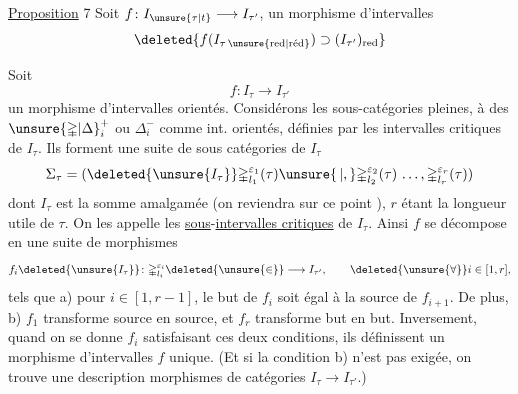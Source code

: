 \uline{Proposition} 7 Soit $f\colon I_{\unsure{\tau|t}}\longrightarrow I_{\tau'}$, un morphisme
d'intervalles   
\[
\deleted{f(I_{\tau\,\unsure{\mathrm{red}|\mathrm{r\acute ed}}})\supset(I_{\tau'})_{\mathrm{red}}}
\]

Soit
\[
 f\colon I_\tau\longrightarrow I_{\tau'}
\]
un morphisme d'intervalles orientés. 
Considérons les sous-catégories pleines, 
à des $\unsure{\mathbb{\Delta}|\Delta}_i^+$ ou $\mathbb{\Delta}_i^-$ comme int. orientés,
 définies par les intervalles critiques de
$I_\tau$. Ils forment une suite \inserted{$\Sigma_\tau$} de sous catégories
de $I_\tau$
\[
 \Sigma_\tau=(\deleted{\unsure{I_{\tau}}}\mathbb{\Delta}_{l_1}^{\varepsilon_1}(\tau)\unsure{\,|,}
 \mathbb{\Delta}_{l_2}^{\varepsilon_2}(\tau)\,\ldots,\mathbb{\Delta}_{l_r}^{\varepsilon_r}(\tau))
\]
dont $I_\tau$ est la somme amalgamée (on reviendra
sur ce point ), $r$ étant la longueur utile de
$\tau$. On les appelle les \uline{sous}-\uline{intervalles
critiques} de $I_\tau$. Ainsi $f$ se décompose en
une suite de morphismes
\[
 f_i\deleted{\unsure{I_\tau}}\colon\mathbb{\Delta}_{l_i}^{\varepsilon_i}\deleted{\unsure{\in}}
 \longrightarrow I_{\tau'},\qquad \deleted{\unsure{\forall}}i\in[1,r],
\]
tels que a) pour $i\in[1,r-1]$, le but de $f_i$
soit égal à la source de $f_{i+1}$.  De
plus, b) $f_1$ transforme source en source, et $f_r$ transforme
but en but.  Inversement, quand
on se donne  $f_i$ satisfaisant ces deux conditions,
ils définissent un morphisme d'intervalles $f$
unique. (Et si la condition b) n'est pas 
exigée, on trouve une description  morphismes
de catégories $I_\tau\longrightarrow I_{\tau'}$.)
